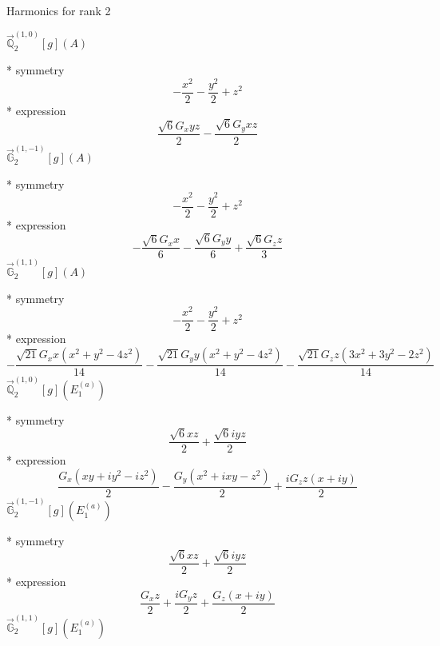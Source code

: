 \documentclass[fleqn,8pt]{jsarticle}
\begin{document}
\noindent * Harmonics for rank 2

\noindent\quad $\vec{\mathbb{Q}}_{2}^{(1,0)}[g](A)$

\noindent\quad ** symmetry
\begin{dmath*}
- \frac{x^{2}}{2} - \frac{y^{2}}{2} + z^{2}
\end{dmath*}
\noindent\quad ** expression
\begin{dmath*}
\frac{\sqrt{6} G_{x} y z}{2} - \frac{\sqrt{6} G_{y} x z}{2}
\end{dmath*}
\noindent\quad $\vec{\mathbb{G}}_{2}^{(1,-1)}[g](A)$

\noindent\quad ** symmetry
\begin{dmath*}
- \frac{x^{2}}{2} - \frac{y^{2}}{2} + z^{2}
\end{dmath*}
\noindent\quad ** expression
\begin{dmath*}
- \frac{\sqrt{6} G_{x} x}{6} - \frac{\sqrt{6} G_{y} y}{6} + \frac{\sqrt{6} G_{z} z}{3}
\end{dmath*}
\noindent\quad $\vec{\mathbb{G}}_{2}^{(1,1)}[g](A)$

\noindent\quad ** symmetry
\begin{dmath*}
- \frac{x^{2}}{2} - \frac{y^{2}}{2} + z^{2}
\end{dmath*}
\noindent\quad ** expression
\begin{dmath*}
- \frac{\sqrt{21} G_{x} x \left(x^{2} + y^{2} - 4 z^{2}\right)}{14} - \frac{\sqrt{21} G_{y} y \left(x^{2} + y^{2} - 4 z^{2}\right)}{14} - \frac{\sqrt{21} G_{z} z \left(3 x^{2} + 3 y^{2} - 2 z^{2}\right)}{14}
\end{dmath*}
\noindent\quad $\vec{\mathbb{Q}}_{2}^{(1,0)}[g](E_{1}^{(a)})$

\noindent\quad ** symmetry
\begin{dmath*}
\frac{\sqrt{6} x z}{2} + \frac{\sqrt{6} i y z}{2}
\end{dmath*}
\noindent\quad ** expression
\begin{dmath*}
\frac{G_{x} \left(x y + i y^{2} - i z^{2}\right)}{2} - \frac{G_{y} \left(x^{2} + i x y - z^{2}\right)}{2} + \frac{i G_{z} z \left(x + i y\right)}{2}
\end{dmath*}
\noindent\quad $\vec{\mathbb{G}}_{2}^{(1,-1)}[g](E_{1}^{(a)})$

\noindent\quad ** symmetry
\begin{dmath*}
\frac{\sqrt{6} x z}{2} + \frac{\sqrt{6} i y z}{2}
\end{dmath*}
\noindent\quad ** expression
\begin{dmath*}
\frac{G_{x} z}{2} + \frac{i G_{y} z}{2} + \frac{G_{z} \left(x + i y\right)}{2}
\end{dmath*}
\noindent\quad $\vec{\mathbb{G}}_{2}^{(1,1)}[g](E_{1}^{(a)})$
\end{document}

